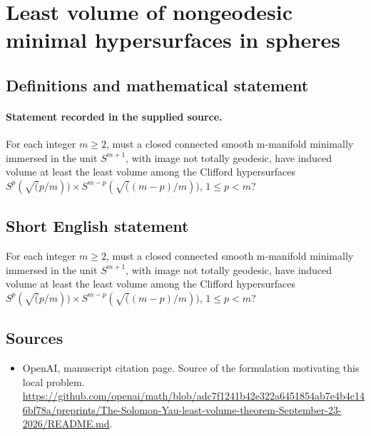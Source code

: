 \documentclass[11pt]{article}
\begin{document}
\section*{Least volume of nongeodesic minimal hypersurfaces in spheres}\label{statement}
\subsection{Definitions and mathematical statement}
\paragraph{Statement recorded in the supplied source.}
For each integer $m\geq 2$, must a closed connected smooth m-manifold minimally immersed in the unit $S^{m+1}$, with image not totally geodesic, have induced volume at least the least volume among the Clifford hypersurfaces $S^p(\surd (p/m))×S^{m-p}(\surd ((m-p)/m))$, $1\leq p<m$?
\subsection{Short English statement}
For each integer $m\geq 2$, must a closed connected smooth m-manifold minimally immersed in the unit $S^{m+1}$, with image not totally geodesic, have induced volume at least the least volume among the Clifford hypersurfaces $S^p(\surd (p/m))×S^{m-p}(\surd ((m-p)/m))$, $1\leq p<m$?
\subsection{Sources}
\begin{itemize}
\item[S1] OpenAI, manuscript citation page. Source of the formulation motivating this local problem.
\url{https://github.com/openai/math/blob/adc7f1241b42e322a6451854ab7e4b4c146bf78a/preprints/The-Solomon-Yau-least-volume-theorem-September-23-2026/README.md}.
\end{itemize}
\end{document}
